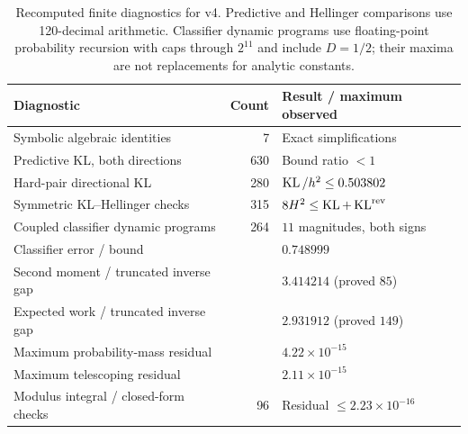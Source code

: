 \begin{table}[htbp]
\centering\small
\begin{tabularx}{\textwidth}{@{}Xrl@{}}
\toprule
Diagnostic & Count & Result / maximum observed \\
\midrule
Symbolic algebraic identities & 7 & Exact simplifications \\
Predictive KL, both directions & 630 & Bound ratio $<1$ \\
Hard-pair directional KL & 280 & $\operatorname{KL}/h^2\le0.503802$ \\
Symmetric KL--Hellinger checks & 315 & $8H^2\le\operatorname{KL}+\operatorname{KL}^{\rm rev}$ \\
Coupled classifier dynamic programs & 264 & $11$ magnitudes, both signs \\
Classifier error / bound & & $0.748999$ \\
Second moment / truncated inverse gap & & $3.414214$ (proved $85$) \\
Expected work / truncated inverse gap & & $2.931912$ (proved $149$) \\
Maximum probability-mass residual & & $4.22\times10^{-15}$ \\
Maximum telescoping residual & & $2.11\times10^{-15}$ \\
Modulus integral / closed-form checks & 96 & Residual $\le2.23\times10^{-16}$ \\
\bottomrule
\end{tabularx}
\caption{Recomputed finite diagnostics for v4. Predictive and Hellinger
comparisons use 120-decimal arithmetic. Classifier dynamic programs use
floating-point probability recursion with caps through $2^{11}$ and include
$D=1/2$; their maxima are not replacements for analytic constants.}
\label{tab:verification}
\end{table}
